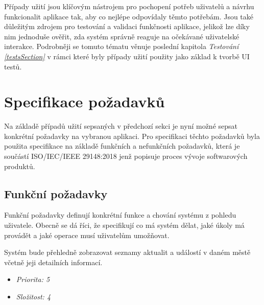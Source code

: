 \bigskip

Případy užití jsou klíčovým nástrojem pro pochopení potřeb uživatelů a návrhu funkcionalit aplikace tak, aby co nejlépe odpovídaly těmto potřebám. 
Jsou také důležitým zdrojem pro testování a validaci funkčnosti aplikace, jelikož lze díky nim jednoduše ověřit, zda systém správně reaguje na očekávané 
uživatelské interakce. Podrobněji se tomuto tématu věnuje poslední kapitola \textit{Testování \ref{testsSection}} v rámci které byly případy užití
použity jako základ k tvorbě UI testů.



\section{Specifikace požadavků}
Na základě případů užití sepsaných v předchozí sekci je nyní možné sepsat konkrétní požadavky na vybranou aplikaci.
Pro specifikaci těchto požadavků byla použita specifikace na základě funkčních a nefunkčních požadavků, která je součástí ISO/IEC/IEEE 29148:2018
jenž popisuje proces vývoje softwarových produktů.

\subsection{Funkční požadavky}
Funkční požadavky definují konkrétní funkce a chování systému z pohledu uživatele. Obecně se dá říci, že specifikují
co má systém dělat, jaké úkoly má provádět a jaké operace musí uživatelům umožňovat. 


Systém bude přehledně zobrazovat seznamy aktualit a událostí v daném městě včetně jeji detailních informací.

\begin{itemize}
  \item \textit{Priorita: 5}
  \item \textit{Složitost: 4}
\end{itemize}


